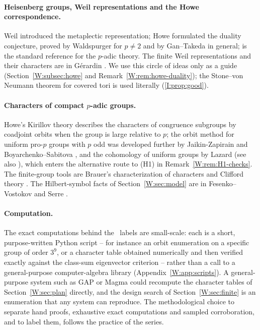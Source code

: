 \paragraph{Heisenberg groups, Weil representations and the Howe
correspondence.}  Weil \cite{Wei64} introduced the metaplectic
representation; Howe \cite{How79} formulated the duality conjecture, proved
by Waldspurger \cite{Wal90} for $p\ne2$ and by Gan--Takeda \cite{GT16} in general;
\cite{MVW87} is the standard reference for the $p$-adic theory.  The finite
Weil representations and their characters are in G\'erardin \cite{Ger77}.
We use this circle of ideas only as a guide (Section~\ref{W:subsec:howe}
and Remark~\ref{W:rem:howe-duality}); the Stone--von Neumann theorem for
covered tori is used literally (\cref{I:prop:good}).

\paragraph{Characters of compact $p$-adic groups.}  Howe's Kirillov
theory \cite{How77a} describes the characters of congruence subgroups by
coadjoint orbits when the group is large relative to $p$; the orbit
method for uniform pro-$p$ groups with $p$ odd was developed further by
Jaikin-Zapirain \cite{Jai06} and Boyarchenko--Sabitova \cite{BS08}, and the
cohomology of uniform groups by Lazard \cite{Laz65} (see also \cite{SW00}), which
enters the alternative route to (H1) in Remark~\ref{W:rem:H1-checks}.  The
finite-group tools are Brauer's characterization of characters and
Clifford theory \cite{Isa76}.  The Hilbert-symbol facts of
Section~\ref{W:sec:model} are in Fesenko--Vostokov \cite{FV02} and Serre \cite{Ser79}.

\paragraph{Computation.}  The exact computations behind the \Pctag\
labels are small-scale: each is a short, purpose-written Python
script -- for instance an orbit enumeration on a specific group of
order $3^9$, or a character table obtained numerically and then
verified exactly against the class-sum eigenvector criterion --
rather than a call to a general-purpose computer-algebra library
(Appendix~\ref{W:app:scripts}).  A general-purpose system such as
GAP or Magma could recompute the
character tables of Section~\ref{W:sec:plan} directly, and the design
search of Section~\ref{W:sec:finite} is an enumeration that any system can
reproduce.  The methodological choice to separate hand proofs,
exhaustive exact computations and sampled corroboration, and to label
them, follows the practice of the series.
\endgroup
